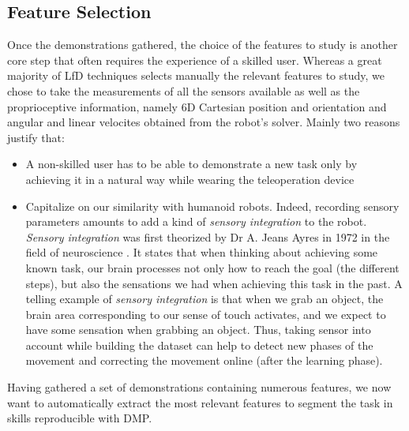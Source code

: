 \documentclass[conference]{IEEEtran}
\begin{document}
\subsection{Feature Selection} \label{feature_selection}

Once the demonstrations gathered, the choice of the features to study is another core step that often requires the experience of a skilled user. Whereas a great majority of LfD techniques selects manually the relevant features to study, we chose to take the measurements of all the sensors available as well as the proprioceptive information, namely 6D Cartesian position and orientation and angular and linear velocites obtained from the robot's solver. Mainly two reasons justify that:

 \begin{itemize}
     \item A non-skilled user has to be able to demonstrate a new task only by achieving it in a  natural way while wearing the teleoperation device
     \item Capitalize on our similarity with humanoid robots. Indeed, recording sensory parameters amounts to add a kind of \textit{sensory integration} to the robot. \textit{Sensory integration} was first theorized by Dr A. Jeans Ayres in 1972 in the field of neuroscience \cite{ayres_improving_1972}. It states that when thinking about achieving some known task, our brain processes not only how to reach the goal (the different steps), but also the sensations we had when achieving this task in the past. 
A telling example of \textit{sensory integration} is that when we grab an object, the brain area corresponding to our sense of touch activates, and we expect to have some sensation when grabbing an object. 
Thus, taking sensor into account while building the dataset can help to detect new phases of the movement \cite{sensory_seg} and correcting the movement online (after the learning phase). \newline

\end{itemize}


Having gathered a set of demonstrations containing numerous features, we now want to automatically extract the most relevant features to segment the task in skills reproducible with DMP.
\end{document}
